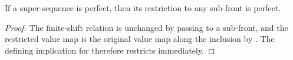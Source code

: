 \begin{lemma}
If a super-sequence is perfect, then its restriction to any sub-front is
perfect.
\end{lemma}
\begin{proof}
The finite-shift relation is unchanged by passing to a sub-front, and the
restricted value map is the original value map along the inclusion by
.  The defining implication for
 therefore restricts immediately.
\end{proof}
